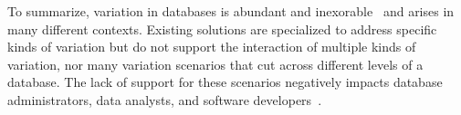 


To summarize, variation in databases is abundant and
inexorable~\cite{dbDecay16Stonebraker} and arises in many different contexts.
Existing solutions are specialized to address specific kinds of variation but
do not support the interaction of multiple kinds of variation, nor many
variation scenarios that cut across different levels of a database. The lack of
support for these scenarios negatively impacts database administrators, data
analysts, and software developers~\cite{dbSPLevolve}. 


